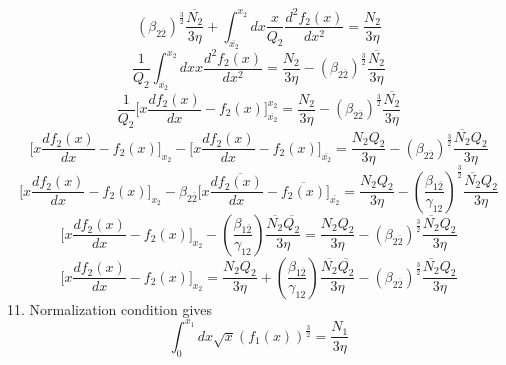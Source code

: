 \documentclass[fleqn, 10pt]{article}
\begin{document}
        \begin{equation*}
            (\beta_{2\overline{2}})^\frac{3}{2}\frac{\overline{N_2}}{3\eta} + \int^{x_2}_{\overline{x_2}}dx \frac{x}{Q_2} \frac{d^2f_2(x)}{dx^2} = \frac{N_2}{3\eta}
        \end{equation*}
        \begin{equation*}
            \frac{1}{Q_2}\int^{x_2}_{\overline{x_2}}dx x \frac{d^2f_2(x)}{dx^2} = \frac{N_2}{3\eta} - (\beta_{2\overline{2}})^\frac{3}{2} \frac{\overline{N_2}}{3\eta}
        \end{equation*}
        \begin{equation*}
            \frac{1}{Q_2} \biggl[x\frac{df_2(x)}{dx} - f_2(x)\biggr]^{x_2}_{\overline{x_2}} = \frac{N_2}{3\eta} - (\beta_{2\overline{2}})^\frac{3}{2} \frac{\overline{N_2}}{3\eta}
        \end{equation*}
        \begin{equation*}
            \biggl[x\frac{df_2(x)}{dx}-f_2(x)\biggr]_{x_2} - \biggl[x\frac{df_2(x)}{dx}-f_2(x)\biggr]_{\overline{x_2}} = \frac{N_2Q_2}{3\eta} - (\beta_{2\overline{2}})^\frac{3}{2} \frac{\overline{N_2}Q_2}{3\eta}
        \end{equation*}
        \begin{equation*}
            \biggl[x\frac{df_2(x)}{dx} - f_2(x)\biggr]_{x_2} - \beta_{2\overline{2}}\biggl[x\frac{d\overline{f_2(x)}}{dx} - \overline{f_2(x)}\biggr]_{\overline{x_2}} = \frac{N_2Q_2}{3\eta} -\left(\frac{\beta_{1\overline{2}}}{\gamma_{12}}\right)^\frac{3}{2}\frac{\overline{N_2}Q_2}{3\eta}
        \end{equation*}
        \begin{equation*}
            \biggl[x\frac{df_2(x)}{dx}-f_2(x)\biggr]_{x_2} - \left(\frac{\beta_{1\overline{2}}}{\gamma_{12}}\right)\frac{\overline{N_2}\overline{Q_2}}{3\eta} = \frac{N_2Q_2}{3\eta}-(\beta_{2\overline{2}})^\frac{3}{2} \frac{\overline{N_2}Q_2}{3\eta}
        \end{equation*}
        \begin{equation}
            \biggl[x\frac{df_2(x)}{dx}- f_2(x)\biggr]_{x_2} = \frac{N_2Q_2}{3\eta}+ \left(\frac{\beta_{1\overline{2}}}{\gamma_{12}}\right)\frac{\overline{N_2}\overline{Q_2}}{3\eta} - (\beta_{2\overline{2}})^\frac{3}{2} \frac{\overline{N_2}Q_2}{3\eta}
            \label{35}
        \end{equation}
11.        Normalization condition gives
        \begin{equation*}
            \int^{x_1}_0 dx \sqrt{x} (f_1(x))^\frac{3}{2} = \frac{N_1}{3\eta}
        \end{equation*}
\end{document}
